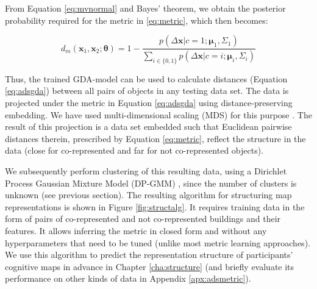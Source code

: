 From Equation \ref{eq:mvnormal} and Bayes' theorem, we obtain the posterior probability required for the metric in \ref{eq:metric}, which then becomes:

\begin{equation}
\label{eq:adsgda}
d_m(\bm x_1, \bm x_2; \bm{\theta}) = 1 - \frac{p( \Delta \bm x | c=1; \bm \mu_1, \Sigma_1)}{\sum_{i \in \{0,1\}} {p( \Delta \bm x | c=i; \bm \mu_i, \Sigma_i)}}
\end{equation}


Thus, the trained GDA-model can be used to calculate distances (Equation \ref{eq:adsgda}) between all pairs of objects in any testing data set. The data is projected under the metric in Equation \ref{eq:adsgda} using distance-preserving embedding. We have used multi-dimensional scaling (MDS) for this purpose \citep{borg2005modern}. The result of this projection is a data set embedded such that Euclidean pairwise distances therein, prescribed by Equation \ref{eq:metric}, reflect the structure in the data (close for co-represented and far for not co-represented objects).

We subsequently perform clustering of this resulting data, using a Dirichlet Process Gaussian Mixture Model (DP-GMM) \citep{rasmussen1999infinite}, since the number of clusters is unknown (see previous section). The resulting algorithm for structuring map representations is shown in Figure \ref{fig:structalg}. It requires training data in the form of pairs of co-represented and not co-represented buildings and their features. It allows inferring the metric in closed form and without any hyperparameters that need to be tuned (unlike most metric learning approaches). We use this algorithm to predict the representation structure of participants' cognitive maps in advance in Chapter \ref{cha:structure} (and briefly evaluate its performance on other kinds of data in Appendix \ref{apx:adsmetric}).

